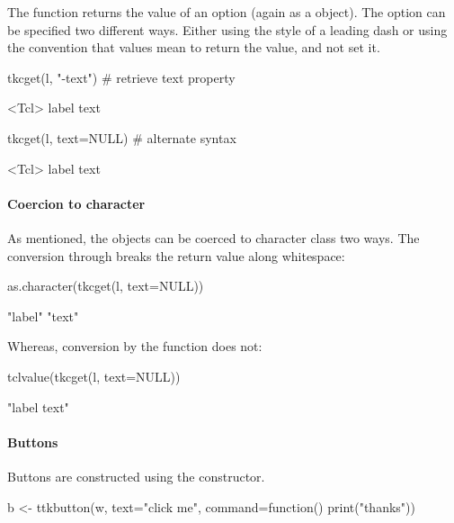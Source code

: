 The  function returns the value of an
option (again as a  object). The option can be specified
two different ways. Either using the \TK\/ style of a leading dash or
using the \R{} convention that  values mean to return the value,
and not set it.


\begin{Schunk}
\begin{Sinput}
 tkcget(l, "-text")                      # retrieve text property
\end{Sinput}
\begin{Soutput}
<Tcl> label text 
\end{Soutput}
\begin{Sinput}
 tkcget(l, text=NULL)                    # alternate syntax
\end{Sinput}
\begin{Soutput}
<Tcl> label text 
\end{Soutput}
\end{Schunk}

\paragraph{Coercion to character}
As mentioned, the  objects can be coerced to character class two ways.
The conversion through  breaks the return value along whitespace:
\begin{Schunk}
\begin{Sinput}
 as.character(tkcget(l, text=NULL))
\end{Sinput}
\begin{Soutput}
[1] "label" "text" 
\end{Soutput}
\end{Schunk}
%
Whereas, conversion by the  function does not:
\begin{Schunk}
\begin{Sinput}
 tclvalue(tkcget(l, text=NULL))
\end{Sinput}
\begin{Soutput}
[1] "label text"
\end{Soutput}
\end{Schunk}
%


\paragraph{Buttons}
Buttons are constructed using the  constructor.
\begin{Schunk}
\begin{Sinput}
 b <- ttkbutton(w, text="click me", 
                command=function() print("thanks"))
\end{Sinput}
\end{Schunk}

